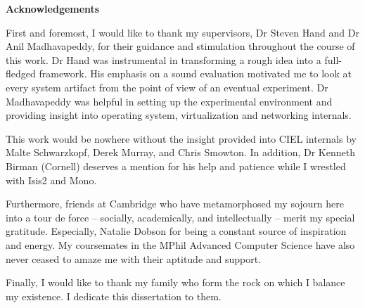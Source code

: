 \newpage
{\Huge \bf Acknowledgements}

\vspace{24pt} 
First and foremost, I would like to thank my supervisors, Dr Steven Hand and Dr
Anil Madhavapeddy, for their guidance and stimulation throughout the course of
this work. Dr Hand was instrumental in transforming a rough idea into a
full-fledged framework. His emphasis on a sound evaluation motivated me to look
at every system artifact from the point of view of an eventual experiment. Dr
Madhavapeddy was helpful in setting up the experimental environment and
providing insight into operating system, virtualization and networking
internals.

This work would be nowhere without the insight provided into CIEL internals by
Malte Schwarzkopf, Derek Murray, and Chris Smowton. In addition, Dr Kenneth
Birman (Cornell) deserves a mention for his help and patience while I wrestled
with Isis2 and Mono.

Furthermore, friends at Cambridge who have metamorphosed my sojourn here into a
tour de force  -- socially, academically, and intellectually -- merit my special
gratitude. Especially, Natalie Dobson for being a constant source of inspiration
and energy. My coursemates in the MPhil Advanced Computer Science have also
never ceased to amaze me with their aptitude and support.

Finally, I would like to thank my family who form the rock on which I balance my
existence. I dedicate this dissertation to them.

\vfill

\newpage
\vspace*{\fill}

